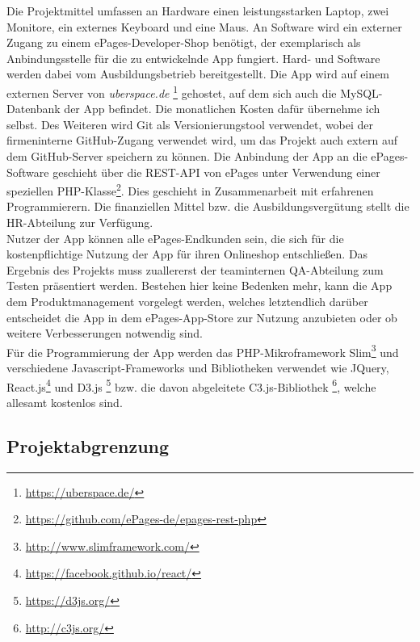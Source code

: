  Die Projektmittel umfassen an Hardware einen leistungsstarken Laptop, zwei Monitore, ein externes Keyboard und eine Maus. An Software wird ein externer Zugang zu einem ePages-Developer-Shop benötigt, der exemplarisch als Anbindungsstelle für die zu entwickelnde \acs{App} fungiert. Hard- und Software werden dabei vom Ausbildungsbetrieb bereitgestellt. Die \acs{App} wird auf einem externen Server von \textit{uberspace.de} \footnote{\url{https://uberspace.de/}} gehostet, auf dem sich auch die \acs{MySQL}-Datenbank der \acs{App} befindet. Die monatlichen Kosten dafür übernehme ich selbst. Des Weiteren wird \acs{Git} als Versionierungstool verwendet, wobei der firmeninterne \acs{GitHub}-Zugang verwendet wird, um das Projekt auch extern auf dem \acs{GitHub}-Server speichern zu können. Die Anbindung der \acs{App} an die ePages-Software geschieht über die \acs{REST-API} von ePages unter Verwendung einer speziellen \acs{PHP}-Klasse\footnote{\url{https://github.com/ePages-de/epages-rest-php}}. Dies geschieht in Zusammenarbeit mit erfahrenen Programmierern. Die finanziellen Mittel bzw. die Ausbildungsvergütung stellt die \acs{HR}-Abteilung zur Verfügung.\\
Nutzer der \acs{App} können alle ePages-Endkunden sein, die sich für die kostenpflichtige Nutzung der \acs{App} für ihren Onlineshop entschließen. Das Ergebnis des Projekts muss zuallererst der teaminternen \acs{QA}-Abteilung zum Testen präsentiert werden. Bestehen hier keine Bedenken mehr, kann die \acs{App} dem Produktmanagement vorgelegt werden, welches letztendlich darüber entscheidet die \acs{App} in dem ePages-App-Store zur Nutzung anzubieten oder ob weitere Verbesserungen notwendig sind.\\
Für die Programmierung der \acs{App} werden das \acs{PHP}-Mikroframework Slim\footnote{\url{http://www.slimframework.com/}} und verschiedene Javascript-Frameworks und Bibliotheken verwendet wie JQuery, React.js\footnote{\url{https://facebook.github.io/react/}} und D3.js \footnote{\url{https://d3js.org/}} bzw. die davon abgeleitete C3.js-Bibliothek \footnote{\url{http://c3js.org/}}, welche allesamt kostenlos sind.

\subsection{Projektabgrenzung} 
\label{sec:Projektabgrenzung}

